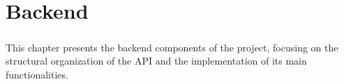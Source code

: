 \chapter{Backend}\label{ch:backend}
\paragraph{}This chapter presents the backend components of the project, focusing on the structural organization of the API and the implementation of its main functionalities.


